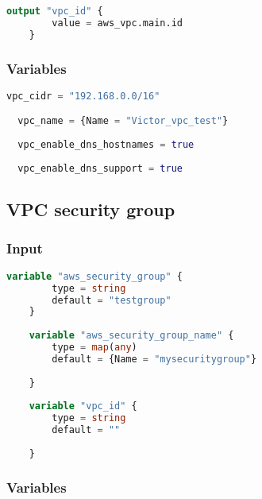 \begin{lstlisting}[language=terraform]
    output "vpc_id" {
        value = aws_vpc.main.id
    }   
\end{lstlisting}

\subsubsection{
{Variables}}

\begin{lstlisting}[language=terraform]
  vpc_cidr = "192.168.0.0/16"

  vpc_name = {Name = "Victor_vpc_test"}
  
  vpc_enable_dns_hostnames = true
  
  vpc_enable_dns_support = true
\end{lstlisting}

\subsection{
{VPC security group}}
\label{sec:VPC security group}

\subsubsection{
{Input}}

\begin{lstlisting}[language=terraform]
    variable "aws_security_group" {
        type = string
        default = "testgroup"
    }
    
    variable "aws_security_group_name" {
        type = map(any)
        default = {Name = "mysecuritygroup"}
      
    }
    
    variable "vpc_id" {
        type = string
        default = ""
      
    }
\end{lstlisting}

\subsubsection{
{Variables}}


